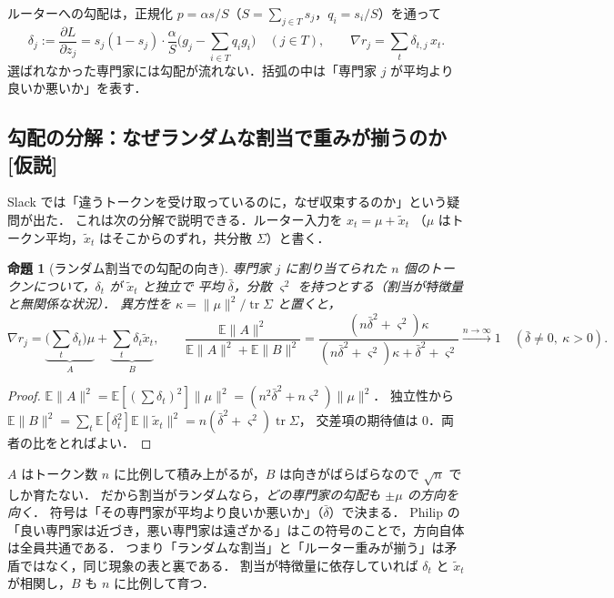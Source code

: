 \documentclass[a4paper,11pt]{ltjsarticle}
\theoremstyle{definition}
\theoremstyle{plain}
\newtheorem{proposition}[definition]{命題}
\newcommand{\E}{\mathbb{E}}
\DeclareMathOperator{\tr}{tr}
\newcommand{\norm}[1]{\lVert #1\rVert}
\newcommand{\Hyp}{\textsf{\textcolor{cO}{[仮説]}}}
\begin{document}
ルーターへの勾配は，正規化 $p=\alpha s/S$（$S=\sum_{j\in T}s_j$，$q_i=s_i/S$）を通って
\begin{equation}
\delta_j := \frac{\partial L}{\partial z_j}
= s_j(1-s_j)\cdot\frac{\alpha}{S}\Big(g_j-\sum_{i\in T}q_i g_i\Big)\quad(j\in T),
\qquad \nabla r_j=\sum_t \delta_{t,j}\,x_t .
\label{eq:routergrad}
\end{equation}
選ばれなかった専門家には勾配が流れない．括弧の中は「専門家 $j$ が平均より良いか悪いか」を表す．

\subsection{勾配の分解：なぜランダムな割当で重みが揃うのか \Hyp}
Slack では「違うトークンを受け取っているのに，なぜ収束するのか」という疑問が出た．
これは次の分解で説明できる．ルーター入力を $x_t=\mu+\tilde x_t$
（$\mu$ はトークン平均，$\tilde x_t$ はそこからのずれ，共分散 $\Sigma$）と書く．

\begin{proposition}[ランダム割当での勾配の向き]\label{prop:grad}
専門家 $j$ に割り当てられた $n$ 個のトークンについて，$\delta_t$ が $\tilde x_t$ と独立で
平均 $\bar\delta$，分散 $\varsigma^2$ を持つとする（割当が特徴量と無関係な状況）．
異方性を $\kappa=\norm{\mu}^2/\tr\Sigma$ と置くと，
\[
\nabla r_j=\underbrace{\Big(\textstyle\sum_t\delta_t\Big)\mu}_{A}+\underbrace{\textstyle\sum_t\delta_t\tilde x_t}_{B},\qquad
\frac{\E\norm{A}^2}{\E\norm{A}^2+\E\norm{B}^2}
=\frac{(n\bar\delta^2+\varsigma^2)\kappa}{(n\bar\delta^2+\varsigma^2)\kappa+\bar\delta^2+\varsigma^2}
\xrightarrow{n\to\infty}1\quad(\bar\delta\ne0,\ \kappa>0).
\]
\end{proposition}
\begin{proof}
$\E\norm{A}^2=\E[(\sum\delta_t)^2]\norm{\mu}^2=(n^2\bar\delta^2+n\varsigma^2)\norm{\mu}^2$．
独立性から $\E\norm{B}^2=\sum_t\E[\delta_t^2]\E\norm{\tilde x_t}^2=n(\bar\delta^2+\varsigma^2)\tr\Sigma$，
交差項の期待値は 0．両者の比をとればよい．
\end{proof}

\begin{intuitionbox}
$A$ はトークン数 $n$ に比例して積み上がるが，$B$ は向きがばらばらなので $\sqrt n$ でしか育たない．
だから割当がランダムなら，\emph{どの専門家の勾配も $\pm\mu$ の方向を向く}．
符号は「その専門家が平均より良いか悪いか」（$\bar\delta$）で決まる．
Philip の「良い専門家は近づき，悪い専門家は遠ざかる」はこの符号のことで，方向自体は全員共通である．
つまり「ランダムな割当」と「ルーター重みが揃う」は矛盾ではなく，同じ現象の表と裏である．
割当が特徴量に依存していれば $\delta_t$ と $\tilde x_t$ が相関し，$B$ も $n$ に比例して育つ．
\end{intuitionbox}
\end{document}
